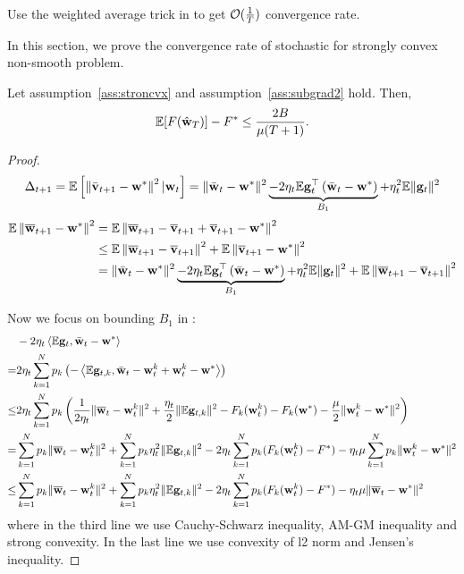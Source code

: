 

Use the weighted average trick in \cite{lacoste2012simpler}
to get ${\mathcal{O}}(\frac{1}{T})$ convergence rate. 

In this section, we prove the convergence rate of stochastic for strongly convex
non-smooth problem.


\begin{theorem}
	Let assumption~\ref{ass:stroncvx} and assumption~\ref{ass:subgrad2} hold. Then,
	\begin{align}
		\mathbb{E}[F(\hat{{\mathbf{w}}}_T)] - F^* \leq \frac{2B}{\mu(T+1)}.
	\end{align}
\end{theorem}


\begin{proof}
	\begin{align}
\Delta_{t+1} = \mathbb{E}\left[\left\|\bar{{\mathbf{v}}}_{t+1}-{\mathbf{w}}^{*}\right\|^2| {\mathbf{w}}_{t}\right]=\|\bar{{\mathbf{w}}}_{t}-{\mathbf{w}}^{*}\|^{2} \underbrace{ - 2 \eta_{t} \mathbb{E} {\mathbf{g}}_{t}^{\top}\left(\bar{{\mathbf{w}}}_{t}-{\mathbf{w}}^{*}\right)}_{B_1} + \eta_{t}^{2} \mathbb{E}\| {\mathbf{g}}_{t} \|^{2}	
\label{eq:expand2}
\end{align}
	\begin{align}
\mathbb{E}\left\|{\overline{\mathbf{w}}}_{t+1}-{\mathbf{w}}^{*}\right\|^2 & =  \mathbb{E}\left\|{\overline{\mathbf{w}}}_{t+1} - {\overline{\mathbf{v}}}_{t+1} + {\overline{\mathbf{v}}}_{t+1} -{\mathbf{w}}^{*}\right\|^2 \\
& \leq \mathbb{E}\left\|{\overline{\mathbf{w}}}_{t+1} - {\overline{\mathbf{v}}}_{t+1}\right\|^2 + \mathbb{E} \left\| {\overline{\mathbf{v}}}_{t+1} -{\mathbf{w}}^{*}\right\|^2 \\
&= \|\bar{{\mathbf{w}}}_{t}-{\mathbf{w}}^{*}\|^{2} \underbrace{ - 2 \eta_{t} \mathbb{E} {\mathbf{g}}_{t}^{\top}\left(\bar{{\mathbf{w}}}_{t}-{\mathbf{w}}^{*}\right)}_{B_1} + \eta_{t}^{2} \mathbb{E}\| {\mathbf{g}}_{t} \|^{2}	+ \mathbb{E}\left\|{\overline{\mathbf{w}}}_{t+1} - {\overline{\mathbf{v}}}_{t+1}\right\|^2
\label{eq:expand21}
\end{align}

Now we focus on bounding $B_1$ in \eq{\ref{eq:expand}}: 
\begin{align}
	& -2 \eta_{t} \left<\mathbb{E} {\mathbf{g}}_{t}, \bar{{\mathbf{w}}}_{t}-{\mathbf{w}}^{*} \right>\\
  = & 2 \eta_{t} \sum_{k=1}^N p_k \left(-\left<\mathbb{E} {\mathbf{g}}_{t,k}, \bar{{\mathbf{w}}}_{t}-{\mathbf{w}}_t^k + {\mathbf{w}}_t^k - {\mathbf{w}}^{*} \right> \right) \\
  \leq& 2 \eta_{t} \sum_{k=1}^N p_k  \left(\frac{1}{2\eta_t} \|\overline{{\mathbf{w}}}_t - {\mathbf{w}}_t^k\|^2 + \frac{\eta_t}{2} \|\mathbb{E} {\mathbf{g}}_{t,k}\|^2 - F_k({\mathbf{w}}_t^k) - F_k({\mathbf{w}}^*) - \frac{\mu}{2} \|{\mathbf{w}}_t^k - {\mathbf{w}}^*\|^2 \right) \\
  =& \sum_{k=1}^N p_k \|\overline{{\mathbf{w}}}_t - {\mathbf{w}}_t^k\|^2 +  \sum_{k=1}^N p_k \eta_t^2 \|\mathbb{E} {\mathbf{g}}_{t,k}\|^2 
  - 2\eta_t\sum_{k=1}^N p_k (F_k({\mathbf{w}}_t^k) - F^*) - \eta_t \mu \sum_{k=1}^N p_k \|{\mathbf{w}}_t^k - {\mathbf{w}}^*\|^2 \\
  \leq & \sum_{k=1}^N p_k \|\overline{{\mathbf{w}}}_t - {\mathbf{w}}_t^k\|^2 +  \sum_{k=1}^N p_k \eta_t^2 \|\mathbb{E} {\mathbf{g}}_{t,k}\|^2 
  - 2\eta_t\sum_{k=1}^N p_k (F_k({\mathbf{w}}_t^k) - F^*) - \eta_t \mu \|{\overline{\mathbf{w}}}_t- {\mathbf{w}}^*\|^2  \label{eq:scvxnsmth1}
\end{align}
where in the third line we use Cauchy-Schwarz inequality, AM-GM inequality and strong convexity.
In the last line we use convexity of l2 norm and Jensen's inequality.


\end{proof}
